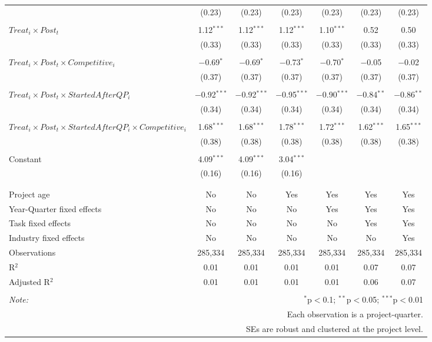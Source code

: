\documentclass[
]{article}
\begin{document}
\begin{table}[H]
\begin{tabular}{@{\extracolsep{-3pt}}lcccccc}
  & (0.23) & (0.23) & (0.23) & (0.23) & (0.23) & (0.23) \\ 
  & & & & & & \\ 
 $Treat_i \times Post_t$ & 1.12$^{***}$ & 1.12$^{***}$ & 1.12$^{***}$ & 1.10$^{***}$ & 0.52 & 0.50 \\ 
  & (0.33) & (0.33) & (0.33) & (0.33) & (0.33) & (0.33) \\ 
  & & & & & & \\ 
 $Treat_i \times Post_t \times Competitive_i$ & $-$0.69$^{*}$ & $-$0.69$^{*}$ & $-$0.73$^{*}$ & $-$0.70$^{*}$ & $-$0.05 & $-$0.02 \\ 
  & (0.37) & (0.37) & (0.37) & (0.37) & (0.37) & (0.37) \\ 
  & & & & & & \\ 
 $Treat_i \times Post_t \times StartedAfterQP_i$ & $-$0.92$^{***}$ & $-$0.92$^{***}$ & $-$0.95$^{***}$ & $-$0.90$^{***}$ & $-$0.84$^{**}$ & $-$0.86$^{**}$ \\ 
  & (0.34) & (0.34) & (0.34) & (0.34) & (0.34) & (0.34) \\ 
  & & & & & & \\ 
 $Treat_i \times Post_t \times StartedAfterQP_i \times Competitive_i$ & 1.68$^{***}$ & 1.68$^{***}$ & 1.78$^{***}$ & 1.72$^{***}$ & 1.62$^{***}$ & 1.65$^{***}$ \\ 
  & (0.38) & (0.38) & (0.38) & (0.38) & (0.38) & (0.38) \\ 
  & & & & & & \\ 
 Constant & 4.09$^{***}$ & 4.09$^{***}$ & 3.04$^{***}$ &  &  &  \\ 
  & (0.16) & (0.16) & (0.16) &  &  &  \\ 
  & & & & & & \\ 
\hline \\[-1.8ex] 
Project age & No & No & Yes & Yes & Yes & Yes \\ 
Year-Quarter fixed effects & No & No & No & Yes & Yes & Yes \\ 
Task fixed effects & No & No & No & No & Yes & Yes \\ 
Industry fixed effects & No & No & No & No & No & Yes \\ 
Observations & 285,334 & 285,334 & 285,334 & 285,334 & 285,334 & 285,334 \\ 
R$^{2}$ & 0.01 & 0.01 & 0.01 & 0.01 & 0.07 & 0.07 \\ 
Adjusted R$^{2}$ & 0.01 & 0.01 & 0.01 & 0.01 & 0.06 & 0.07 \\ 
\hline 
\hline \\[-1.8ex] 
\textit{Note:}  & \multicolumn{6}{r}{$^{*}$p$<$0.1; $^{**}$p$<$0.05; $^{***}$p$<$0.01} \\ 
 & \multicolumn{6}{r}{Each observation is a project-quarter.} \\ 
 & \multicolumn{6}{r}{SEs are robust and clustered at the project level.} \\ 
\end{tabular} 
\end{table}
\end{document}
